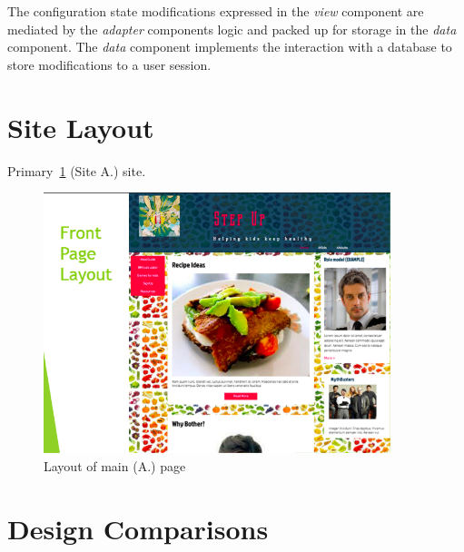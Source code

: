 \documentclass[letterpaper,12pt]{article}
\begin{document}
The configuration state modifications expressed in the \emph{view} component
are mediated by the \emph{adapter} components logic and packed up for storage
in the \emph{data} component. The \emph{data} component implements the
interaction with a database to store modifications to a user session.

\section{Site Layout}

Primary~\cref{fig:layout-mainpage} (Site A.) site.

\begin{figure}[ht!]
  \centering
  \includegraphics[width=0.9\textwidth]{assets/jpg/layout_mainpage}
  \caption{Layout of main (A.) page}
  \label{fig:layout-mainpage}
\end{figure}
\FloatBarrier


\section{Design Comparisons}
\end{document}
